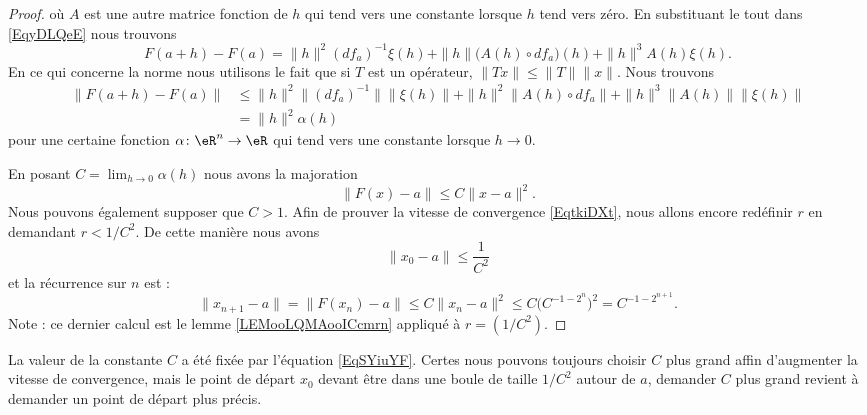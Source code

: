 \begin{proof}
        où \( A\) est une autre matrice fonction de \(h\) qui tend vers une constante lorsque \( h\) tend vers zéro. En substituant le tout dans \eqref{EqyDLQeE} nous trouvons
        \begin{equation}
            F(a+h)-F(a)=\| h \|^2(df_a)^{-1}\xi(h)+\| h \|\big( A(h)\circ df_a \big)(h)+\| h \|^3A(h)\xi(h).
        \end{equation}
        En ce qui concerne la norme nous utilisons le fait que si \( T\) est un opérateur, \( \| Tx \|\leq \| T \|\| x \|\). Nous trouvons
        \begin{subequations}
            \begin{align}
                \| F(a+h)-F(a) \|&\leq \| h \|^2\| (df_a)^{-1} \|\| \xi(h) \|+\| h \|^2\| A(h)\circ df_a \|+\| h \|^3\| A(h) \|\| \xi(h) \|\\
                &=\| h \|^2\alpha(h)
            \end{align}
        \end{subequations}
    pour une certaine fonction \( \alpha\colon \eR^n\to \eR\) qui tend vers une constante lorsque \( h\to 0\). 

    En posant \( C=\lim_{h\to 0}\alpha(h) \) nous avons la majoration
    \begin{equation}        \label{EqSYiuYF}
        \| F(x)-a \|\leq C\| x-a \|^2.
    \end{equation}
    Nous pouvons également supposer que \( C>1\). Afin de prouver la vitesse de convergence \eqref{EqtkiDXt}, nous allons encore redéfinir \( r\) en demandant \( r<1/C^2\). De cette manière nous avons
    \begin{equation}
        \| x_0-a \|\leq \frac{1}{ C^2 }
    \end{equation}
    et la récurrence sur \( n\) est :
    \begin{equation}
        \| x_{n+1}-a \|=\| F(x_n)-a \|\leq C\| x_n-a \|^2\leq C\big( C^{-1-2^n} \big)^2=C^{-1-2^{n+1}}.
    \end{equation}
    Note : ce dernier calcul est le lemme \ref{LEMooLQMAooICcmrn} appliqué à \( r=(1/C^2)\).
\end{proof}

\begin{remark}
    La valeur de la constante \( C\) a été fixée par l'équation \eqref{EqSYiuYF}. Certes nous pouvons toujours choisir \( C\) plus grand affin d'augmenter la vitesse de convergence, mais le point de départ \( x_0\) devant être dans une boule de taille \( 1/C^2\) autour de \( a\), demander \( C \) plus grand revient à demander un point de départ plus précis.
\end{remark}
